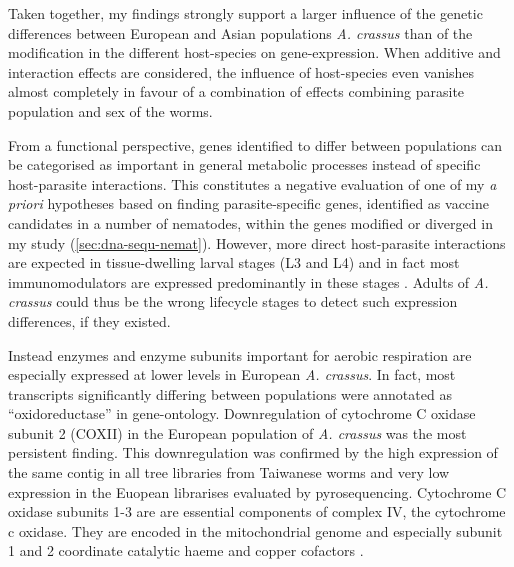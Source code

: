 Taken together, my findings strongly support a larger influence of the
genetic differences between European and Asian populations
\textit{A. crassus} than of the modification in the different
host-species on gene-expression. When additive and interaction effects
are considered, the influence of host-species even vanishes almost
completely in favour of a combination of effects combining parasite
population and sex of the worms.

From a functional perspective, genes identified to differ between
populations can be categorised as important in general metabolic
processes instead of specific host-parasite interactions. This
constitutes a negative evaluation of one of my \textit{a priori}
hypotheses based on finding parasite-specific genes, identified as
vaccine candidates in a number of nematodes, within the genes modified
or diverged in my study (\ref{sec:dna-sequ-nemat}). However, more
direct host-parasite interactions are expected in tissue-dwelling
larval stages (L3 and L4) and in fact most immunomodulators are
expressed predominantly in these stages
\cite{maizels_helminth_2004}. Adults of \textit{A. crassus} could thus
be the wrong lifecycle stages to detect such expression differences,
if they existed.


Instead enzymes and enzyme subunits important for aerobic respiration
are especially expressed at lower levels in European
\textit{A. crassus}. In fact, most transcripts significantly differing
between populations were annotated as ``oxidoreductase'' in
gene-ontology. 
Downregulation of cytochrome C oxidase subunit 2 (COXII) in the
European population of \textit{A. crassus} was the most persistent
finding. This downregulation was confirmed by the high expression of
the same contig in all tree libraries from Taiwanese worms and very
low expression in the Euopean librarises evaluated by pyrosequencing.
Cytochrome C oxidase subunits 1-3 are are essential components of
complex IV, the cytochrome c oxidase. They are encoded in the
mitochondrial genome and especially subunit 1 and 2 coordinate
catalytic haeme and copper cofactors \cite{pmid18023115}.


